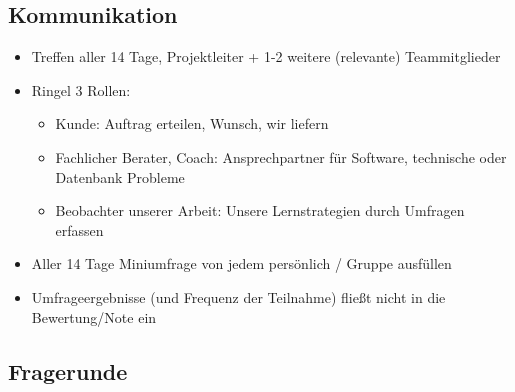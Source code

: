 \documentclass{scrartcl}
\begin{document}
\subsection{Kommunikation}
\begin{itemize}
\item Treffen aller 14 Tage, Projektleiter + 1-2 weitere (relevante) Teammitglieder
\item Ringel 3 Rollen:
    \begin{itemize}
    \item Kunde: Auftrag erteilen, Wunsch, wir liefern
    \item Fachlicher Berater, Coach: Ansprechpartner für Software, technische oder Datenbank Probleme 
    \item Beobachter unserer Arbeit: Unsere Lernstrategien durch Umfragen erfassen
    \end{itemize}
\item Aller 14 Tage Miniumfrage von jedem persönlich / Gruppe ausfüllen
\item Umfrageergebnisse (und Frequenz der Teilnahme) fließt nicht in die Bewertung/Note ein
\end{itemize}
\subsection{Fragerunde}
\end{document}
